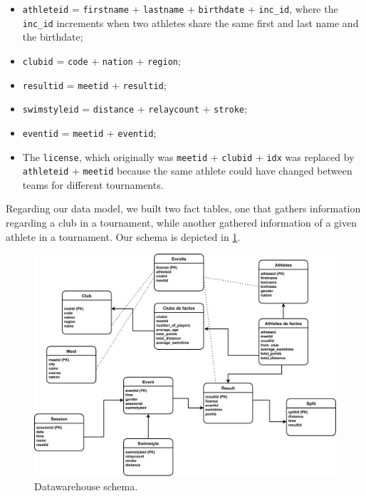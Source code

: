 \documentclass[a4paper, 11pt]{article}
\begin{document}
\begin{itemize}
    \item \texttt{athleteid} = \texttt{firstname} + \texttt{lastname} + \texttt{birthdate} + \texttt{inc\_id}, where the \texttt{inc\_id} increments when two athletes share the same first and last name and the birthdate;
    \item \texttt{clubid} = \texttt{code} + \texttt{nation} + \texttt{region};
    \item \texttt{resultid} = \texttt{meetid} + \texttt{resultid};
    \item \texttt{swimstyleid} = \texttt{distance} + \texttt{relaycount} + \texttt{stroke};
    \item \texttt{eventid} = \texttt{meetid} + \texttt{eventid};
    \item The \texttt{license}, which originally was \texttt{meetid} + \texttt{clubid} + \texttt{idx} was replaced by \texttt{athleteid} + \texttt{meetid} because the same athlete could have changed between teams for different tournaments.
\end{itemize}

Regarding our data model, we built two fact tables, one that gathers information regarding a club in a tournament, while another gathered information of a given athlete in a tournament. Our schema is depicted in \cref{fig:defact}. 

\begin{figure}[ht]
    \centering
    \includegraphics[width=\textwidth]{img/facttables.pdf}
    \caption{Datawarehouse schema.}
    \label{fig:defact}
\end{figure}
\end{document}
